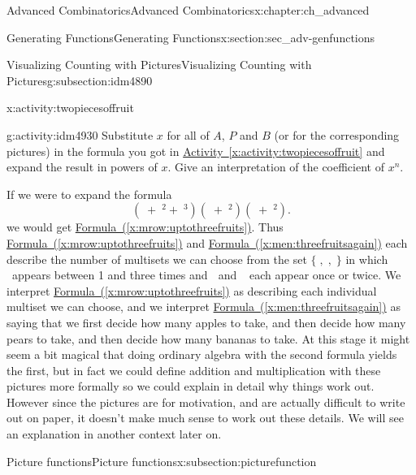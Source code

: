 \documentclass[oneside,10pt,]{book}
\numberwithin{equation}{chapter}
\newcommand{\apple}{\text{🍎}}
\newcommand{\ap}{\apple}
\newcommand{\banana}{\text{🍌}}
\newcommand{\ba}{\banana}
\newcommand{\pear}{\text{🍐}}
\newcommand{\pe}{\pear}
\begin{document}
\begin{chapterptx}{Advanced Combinatorics}{}{Advanced Combinatorics}{}{}{x:chapter:ch_advanced}
\begin{sectionptx}{Generating Functions}{}{Generating Functions}{}{}{x:section:sec_adv-genfunctions}
\begin{subsectionptx}{Visualizing Counting with Pictures}{}{Visualizing Counting with Pictures}{}{}{g:subsection:idm4890}
\begin{activity}{}{x:activity:twopiecesoffruit}
\end{activity}
\begin{activity}{}{g:activity:idm4930}%
Substitute \(x\) for all of \(A\), \(P\) and \(B\) (or for the corresponding pictures) in the formula you got in \hyperref[x:activity:twopiecesoffruit]{Activity~\ref{x:activity:twopiecesoffruit}} and expand the result in powers of \(x\). Give an interpretation of the coefficient of \(x^n\).%
\end{activity}
If we were to expand the formula%
\begin{equation}
(\ap+\ap^2+\ap^3)(\pe+\pe^2)(\ba+\ba^2).\label{x:men:threefruitsagain}
\end{equation}
we would get \hyperref[x:mrow:uptothreefruits]{Formula~(\ref{x:mrow:uptothreefruits})}. Thus \hyperref[x:mrow:uptothreefruits]{Formula~(\ref{x:mrow:uptothreefruits})} and \hyperref[x:men:threefruitsagain]{Formula~(\ref{x:men:threefruitsagain})} each describe the number of multisets we can choose from the set \(\{\ap,\pe,\ba\}\) in which \(\apple\)~appears between 1 and three times and \(\pear\) and \(\banana\)~each appear once or twice. We interpret \hyperref[x:mrow:uptothreefruits]{Formula~(\ref{x:mrow:uptothreefruits})} as describing each individual multiset we can choose, and we interpret \hyperref[x:men:threefruitsagain]{Formula~(\ref{x:men:threefruitsagain})} as saying that we first decide how many apples to take, and then decide how many pears to take, and then decide how many bananas to take. At this stage it might seem a bit magical that doing ordinary algebra with the second formula yields the first, but in fact we could define addition and multiplication with these pictures more formally so we could explain in detail why things work out. However since the pictures are for motivation, and are actually difficult to write out on paper, it doesn't make much sense to work out these details. We will see an explanation in another context later on.%
\end{subsectionptx}
%
%
\typeout{************************************************}
\typeout{************************************************}
%
\begin{subsectionptx}{Picture functions}{}{Picture functions}{}{}{x:subsection:picturefunction}

\end{subsectionptx}
\end{sectionptx}
\end{chapterptx}
\end{document}
